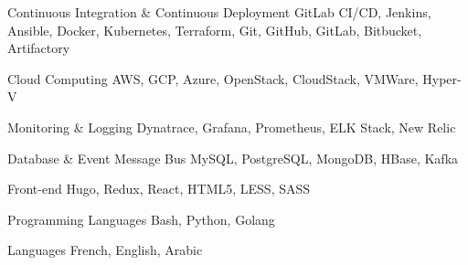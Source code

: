 

\begin{cvskills}

  \cvskill
    {Continuous Integration \& Continuous Deployment} %
    {GitLab CI/CD, Jenkins, Ansible, Docker, Kubernetes, Terraform, Git, GitHub, GitLab, Bitbucket, Artifactory} %


  \cvskill
    {Cloud Computing} %
    {AWS, GCP, Azure, OpenStack, CloudStack, VMWare, Hyper-V} %

  \cvskill
    {Monitoring \& Logging} %
    {Dynatrace, Grafana, Prometheus, ELK Stack, New Relic} %



  \cvskill
    {Database \& Event Message Bus} %
    {MySQL, PostgreSQL, MongoDB, HBase, Kafka} %

  \cvskill
    {Front-end} %
    {Hugo, Redux, React, HTML5, LESS, SASS} %

  \cvskill
    {Programming Languages} %
    {Bash, Python, Golang} %

  \cvskill
    {Languages} %
    {French, English, Arabic} %

\end{cvskills}
